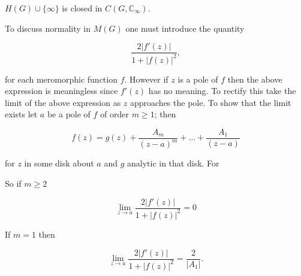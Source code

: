 $H(G) \cup \{\infty\}$ is closed in $C(G, \mathbb{C}_\infty)$.

To discuss normality in $M(G)$ one must introduce the quantity

$$\frac{2|f'(z)|}{1 + |f(z)|^2},$$

for each meromorphic function $f$. However if $z$ is a pole of $f$ then the above expression is meaningless since $f'(z)$ has no meaning. To rectify this take the limit of the above expression as $z$ approaches the pole. To show that the limit exists let $a$ be a pole of $f$ of order $m \geq 1$; then

$$f(z) = g(z) + \frac{A_m}{(z-a)^m} + \ldots + \frac{A_1}{(z-a)}$$

for $z$ in some disk about $a$ and $g$ analytic in that disk. For

So if $m \geq 2$

$$\lim_{z \to a} \frac{2|f'(z)|}{1 + |f(z)|^2} = 0$$

If $m = 1$ then

$$\lim_{z \to a} \frac{2|f'(z)|}{1 + |f(z)|^2} = \frac{2}{|A_1|}.$$